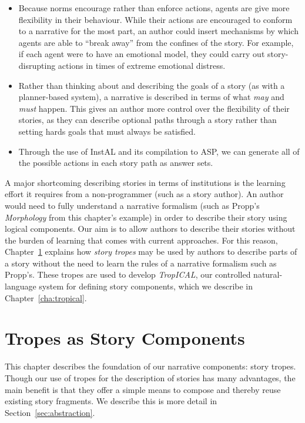\documentclass[11pt]{report}
\begin{document}
\begin{itemize}
  \item Because norms encourage rather than enforce actions, agents are give
    more flexibility in their behaviour. While their actions are encouraged to
    conform to a narrative for the most part, an author could insert mechanisms
    by which agents are able to ``break away'' from the confines of the story.
    For example, if each agent were to have an emotional model, they could carry
    out story-disrupting actions in times of extreme emotional distress.
  \item Rather than thinking about and describing the goals of a story (as with
    a planner-based system), a narrative is described in terms of what
    \emph{may} and \emph{must} happen. This gives an author more control over
    the flexibility of their stories, as they can describe optional paths
    through a story rather than setting hards goals that must always be
    satisfied.
  \item Through the use of InstAL and its compilation to ASP, we can generate
    all of the possible actions in each story path as answer sets.
\end{itemize}

A major shortcoming describing stories in terms of
institutions is the learning effort it requires from a non-programmer (such as a
story author). An author would need to fully understand a narrative formalism (such as Propp's \emph{Morphology} from this chapter's
example) in order to describe their story using logical components. Our aim is
to allow authors to describe their stories without the burden of learning that
comes with current approaches. For this reason, Chapter~\ref{cha:tropes} explains how
\emph{story tropes} may be used by authors to describe parts of a story
without the need to learn the rules of a narrative formalism such as Propp's.
These tropes are used to develop \emph{TropICAL}, our controlled
natural-language system for defining story components, which we describe in Chapter~\ref{cha:tropical}.

\chapter{Tropes as Story Components}
\label{cha:tropes}
This chapter describes the foundation of our narrative components: story
tropes. Though our use of tropes for the description of stories has many
advantages, the main benefit is that they offer a simple means to compose and thereby
reuse existing story fragments. We describe this is more detail in Section~\ref{sec:abstraction}.
\end{document}
